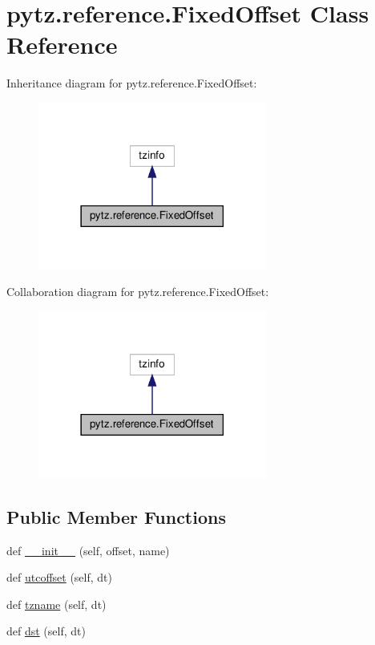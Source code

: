 \hypertarget{classpytz_1_1reference_1_1FixedOffset}{}\section{pytz.\+reference.\+Fixed\+Offset Class Reference}
\label{classpytz_1_1reference_1_1FixedOffset}


Inheritance diagram for pytz.\+reference.\+Fixed\+Offset\+:
\nopagebreak
\begin{figure}[H]
\begin{center}
\leavevmode
\includegraphics[width=213pt]{classpytz_1_1reference_1_1FixedOffset__inherit__graph}
\end{center}
\end{figure}


Collaboration diagram for pytz.\+reference.\+Fixed\+Offset\+:
\nopagebreak
\begin{figure}[H]
\begin{center}
\leavevmode
\includegraphics[width=213pt]{classpytz_1_1reference_1_1FixedOffset__coll__graph}
\end{center}
\end{figure}
\subsection*{Public Member Functions}
\begin{DoxyCompactItemize}
\item 
def \hyperlink{classpytz_1_1reference_1_1FixedOffset_aa31f26c2cc06d5aea38c3566c40a0120}{\+\_\+\+\_\+init\+\_\+\+\_\+} (self, offset, name)
\item 
def \hyperlink{classpytz_1_1reference_1_1FixedOffset_abc4bd2c7fec146926cb626eae4952f10}{utcoffset} (self, dt)
\item 
def \hyperlink{classpytz_1_1reference_1_1FixedOffset_a6854398a80fcaaf428af2f5bbe7078e5}{tzname} (self, dt)
\item 
def \hyperlink{classpytz_1_1reference_1_1FixedOffset_aab3fd754e5cac35a87da8aa9cd37f500}{dst} (self, dt)
\end{DoxyCompactItemize}


